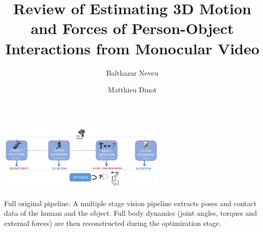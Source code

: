 \documentclass[sigconf, nonacm]{acmart}
\title{Review of Estimating 3D Motion and Forces of Person-Object Interactions from Monocular Video}
\author{Balthazar Neveu}
\affiliation{%
  \institution{ENS Paris-Saclay}
  \city{Saclay}
  \country{France}
}
\author{Matthieu Dinot}
\affiliation{%
  \institution{Ecole Polytechnique}
  \city{Palaiseau}
  \country{France}
}
\begin{document}

  \begin{teaserfigure}
    \includegraphics[width=0.6\textwidth]{figures/authors_original_pipeline.png}
    \centering
    \caption{Full original pipeline. 
    A multiple stage vision pipeline extracts poses and contact data of the human and the object.
    Full body dynamics (joint angles, torques and external forces) are then reconstructed during the optimization stage.
    }
    \label{fig:original_pipeline}
  \end{teaserfigure}

  \maketitle




  
  
  
  
  

  
  

  \newpage

  \appendix
  
  
\end{document}
